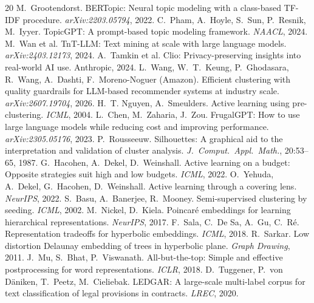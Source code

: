 \documentclass[11pt]{article}
\begin{document}
\begin{thebibliography}{20}
 M.~Grootendorst. BERTopic: Neural topic modeling with a class-based TF-IDF procedure. \emph{arXiv:2203.05794}, 2022.
 C.~Pham, A.~Hoyle, S.~Sun, P.~Resnik, M.~Iyyer. TopicGPT: A prompt-based topic modeling framework. \emph{NAACL}, 2024.
 M.~Wan et al. TnT-LLM: Text mining at scale with large language models. \emph{arXiv:2403.12173}, 2024.
 A.~Tamkin et al. Clio: Privacy-preserving insights into real-world AI use. Anthropic, 2024.
 L.~Wang, W.~T.~Keung, P.~Ghodasara, R.~Wang, A.~Dashti, F.~Moreno-Noguer (Amazon). Efficient clustering with quality guardrails for LLM-based recommender systems at industry scale. \emph{arXiv:2607.19704}, 2026.
 H.~T. Nguyen, A.~Smeulders. Active learning using pre-clustering. \emph{ICML}, 2004.
 L.~Chen, M.~Zaharia, J.~Zou. FrugalGPT: How to use large language models while reducing cost and improving performance. \emph{arXiv:2305.05176}, 2023.
 P.~Rousseeuw. Silhouettes: A graphical aid to the interpretation and validation of cluster analysis. \emph{J.\ Comput.\ Appl.\ Math.}, 20:53--65, 1987.
 G.~Hacohen, A.~Dekel, D.~Weinshall. Active learning on a budget: Opposite strategies suit high and low budgets. \emph{ICML}, 2022.
 O.~Yehuda, A.~Dekel, G.~Hacohen, D.~Weinshall. Active learning through a covering lens. \emph{NeurIPS}, 2022.
 S.~Basu, A.~Banerjee, R.~Mooney. Semi-supervised clustering by seeding. \emph{ICML}, 2002.
 M.~Nickel, D.~Kiela. Poincar\'e embeddings for learning hierarchical representations. \emph{NeurIPS}, 2017.
 F.~Sala, C.~De Sa, A.~Gu, C.~R\'e. Representation tradeoffs for hyperbolic embeddings. \emph{ICML}, 2018.
 R.~Sarkar. Low distortion Delaunay embedding of trees in hyperbolic plane. \emph{Graph Drawing}, 2011.
 J.~Mu, S.~Bhat, P.~Viswanath. All-but-the-top: Simple and effective postprocessing for word representations. \emph{ICLR}, 2018.
 D.~Tuggener, P.~von D\"aniken, T.~Peetz, M.~Cieliebak. LEDGAR: A large-scale multi-label corpus for text classification of legal provisions in contracts. \emph{LREC}, 2020.
\end{thebibliography}
\end{document}
